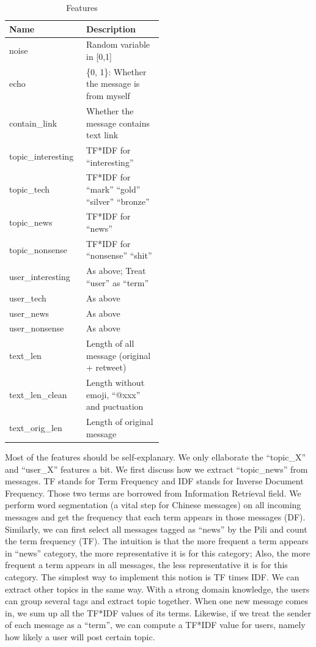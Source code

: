\documentclass{sig-alternate}
\begin{document}
\begin{table}[htb]
	\caption{Features}
	\label{tbl:feature}
	\centering
	\begin{tabular}{l|p{0.5\linewidth}}
		\hline
		Name & Description \\
		\hline
		noise & Random variable in [0,1]\\
		 echo & \{0, 1\}: Whether the message is from myself\\
		contain\_link & Whether the message contains text link\\
		topic\_interesting & TF*IDF for ``interesting'' \\
		topic\_tech & TF*IDF for ``mark'' ``gold'' ``silver'' ``bronze''\\
		topic\_news & TF*IDF for ``news''\\
		topic\_nonsense & TF*IDF for ``nonsense'' ``shit''\\
		user\_interesting & As above; Treat ``user'' as ``term''\\
		user\_tech & As above\\
		user\_news & As above\\
		user\_nonsense & As above\\
		text\_len & Length of all message (original + retweet)\\
		text\_len\_clean & Length without emoji, ``@xxx'' and puctuation\\
		text\_orig\_len & Length of original message\\
		\hline
	\end{tabular}
\end{table}

Most of the features should be self-explanary. 
We only ellaborate the ``topic\_X'' and ``user\_X'' features a bit. 
We first discuss how we extract ``topic\_news'' from messages. 
TF stands for Term Frequency and IDF stands for Inverse Document Frequency. 
Those two terms are borrowed from Information Retrieval field. 
We perform word segmentation (a vital step for Chinese messages) 
on all incoming messages and get the 
frequency that each term appears in those messages (DF).
Similarly, we can first select all messages tagged as ``news'' by the Pili
and count the term frequency (TF). 
The intuition is that the more frequent a term appears in ``news'' category, 
the more representative it is for this category; 
Also, the more frequent a term appears in all messages, 
the less representative it is for this category. 
The simplest way to implement this notion is TF times IDF. 
We can extract other topics in the same way. 
With a strong domain knowledge, the users can group several tags and extract topic together. 
When one new message comes in, we sum up all the TF*IDF values of its terms. 
Likewise, if we treat the sender of each message as a ``term'',
we can compute a TF*IDF value for users,
namely how likely a user will post certain topic. 
\end{document}
